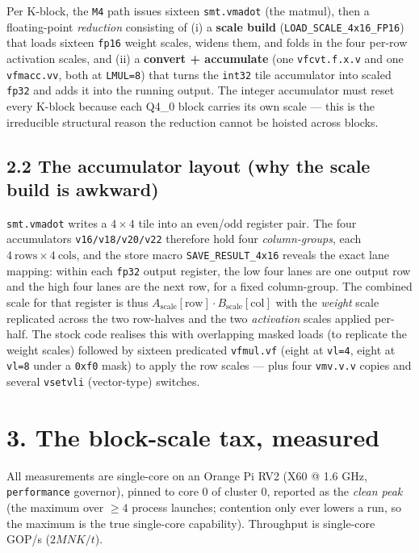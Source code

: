 \documentclass[
]{article}
\begin{document}
Per K-block, the \texttt{M4} path issues sixteen \texttt{smt.vmadot}
(the matmul), then a floating-point \emph{reduction} consisting of (i) a
\textbf{scale build} (\texttt{LOAD\_SCALE\_4x16\_FP16}) that loads
sixteen \texttt{fp16} weight scales, widens them, and folds in the four
per-row activation scales, and (ii) a \textbf{convert + accumulate} (one
\texttt{vfcvt.f.x.v} and one \texttt{vfmacc.vv}, both at
\texttt{LMUL=8}) that turns the \texttt{int32} tile accumulator into
scaled \texttt{fp32} and adds it into the running output. The integer
accumulator must reset every K-block because each Q4\_0 block carries
its own scale --- this is the irreducible structural reason the
reduction cannot be hoisted across blocks.

\subsection{2.2 The accumulator layout (why the scale build is
awkward)}\label{the-accumulator-layout-why-the-scale-build-is-awkward}

\texttt{smt.vmadot} writes a \(4\times4\) tile into an even/odd register
pair. The four accumulators \texttt{v16/v18/v20/v22} therefore hold four
\emph{column-groups}, each \(4\ \text{rows}\times4\ \text{cols}\), and
the store macro \texttt{SAVE\_RESULT\_4x16} reveals the exact lane
mapping: within each \texttt{fp32} output register, the low four lanes
are one output row and the high four lanes are the next row, for a fixed
column-group. The combined scale for that register is thus
\(A_{\text{scale}}[\text{row}]\cdot B_{\text{scale}}[\text{col}]\) with
the \emph{weight} scale replicated across the two row-halves and the two
\emph{activation} scales applied per-half. The stock code realises this
with overlapping masked loads (to replicate the weight scales) followed
by sixteen predicated \texttt{vfmul.vf} (eight at \texttt{vl=4}, eight
at \texttt{vl=8} under a \texttt{0xf0} mask) to apply the row scales ---
plus four \texttt{vmv.v.v} copies and several \texttt{vsetvli}
(vector-type) switches.

\section{3. The block-scale tax,
measured}\label{the-block-scale-tax-measured}

All measurements are single-core on an Orange Pi RV2 (X60 @ 1.6 GHz,
\texttt{performance} governor), pinned to core 0 of cluster 0, reported
as the \emph{clean peak} (the maximum over \(\geq 4\) process launches;
contention only ever lowers a run, so the maximum is the true
single-core capability). Throughput is single-core GOP/s (\(2MNK/t\)).
\end{document}
